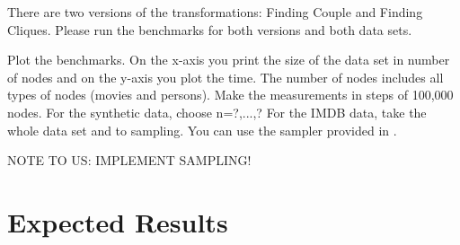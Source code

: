 \documentclass[a4paper,11pt]{article}
\begin{document}
There are two versions of the transformations: Finding Couple and Finding Cliques.
Please run the benchmarks for both versions and both data sets.


Plot the benchmarks. On the x-axis you print the size of the data set
in number of nodes and on the y-axis you plot the time. The number of nodes
includes all types of nodes (movies and persons). Make the measurements in
steps of 100,000 nodes. For the synthetic data, choose n=?,...,?
For the IMDB data, take the whole data set and to sampling. You can use
the sampler provided in \cite{IMDB2EMF}.

NOTE TO US: IMPLEMENT SAMPLING!






\appendix

\section{Expected Results}
\label{sec:expected-results}
\end{document}
